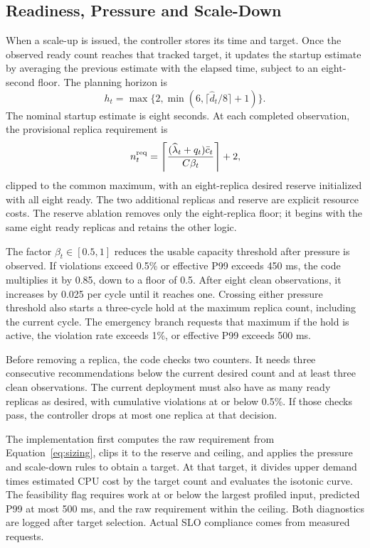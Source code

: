 \documentclass[10pt,twocolumn,a4paper]{article}
\begin{document}
\subsection{Readiness, Pressure and Scale-Down}
When a scale-up is issued, the controller stores its time and target. Once the observed ready count reaches that tracked target, it updates the startup estimate by averaging the previous estimate with the elapsed time, subject to an eight-second floor. The planning horizon is
\begin{equation}h_t=\max\{2,\min(6,\lceil\widehat d_t/8\rceil+1)\}.\end{equation}
The nominal startup estimate is eight seconds. At each completed observation, the provisional replica requirement is
\begin{equation}n_t^{\rm req}=\left\lceil\frac{(\widehat\lambda_t+q_t)\bar c_t}{C\beta_t}\right\rceil+2,\label{eq:sizing}\end{equation}
clipped to the common maximum, with an eight-replica desired reserve initialized with all eight ready. The two additional replicas and reserve are explicit resource costs. The reserve ablation removes only the eight-replica floor; it begins with the same eight ready replicas and retains the other logic.

The factor $\beta_t\in[0.5,1]$ reduces the usable capacity threshold after pressure is observed. If violations exceed 0.5\% or effective P99 exceeds 450 ms, the code multiplies it by 0.85, down to a floor of 0.5. After eight clean observations, it increases by 0.025 per cycle until it reaches one. Crossing either pressure threshold also starts a three-cycle hold at the maximum replica count, including the current cycle. The emergency branch requests that maximum if the hold is active, the violation rate exceeds 1\%, or effective P99 exceeds 500 ms.

Before removing a replica, the code checks two counters. It needs three consecutive recommendations below the current desired count and at least three clean observations. The current deployment must also have as many ready replicas as desired, with cumulative violations at or below 0.5\%. If those checks pass, the controller drops at most one replica at that decision.

The implementation first computes the raw requirement from Equation~\ref{eq:sizing}, clips it to the reserve and ceiling, and applies the pressure and scale-down rules to obtain a target. At that target, it divides upper demand times estimated CPU cost by the target count and evaluates the isotonic curve. The feasibility flag requires work at or below the largest profiled input, predicted P99 at most 500 ms, and the raw requirement within the ceiling. Both diagnostics are logged after target selection. Actual SLO compliance comes from measured requests.
\end{document}
